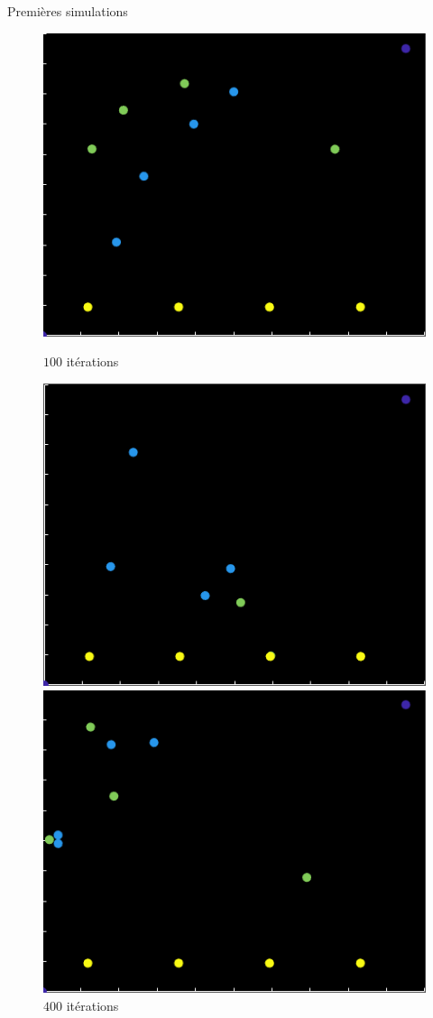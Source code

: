 \documentclass[final,hyperref={pdfpagelabels=false}]{beamer}
\begin{document}
\begin{frame}[t]
\begin{columns}[t]
\begin{column}{.465\textwidth}
\begin{block}{Premi\`eres simulations}
\begin{figure}[h!]
\begin{minipage}[b]{0.50\linewidth}
      \centering \includegraphics[scale=1.4]{simu_100.png}
      \caption{\text{ } $100$ it\'erations}      
   \end{minipage}\hfill
   \begin{minipage}[b]{0.50\linewidth}   
      \centering \includegraphics[scale=1.4]{simu_400.png}
      \caption{\text{ } $400$ it\'erations}      
   \end{minipage}
   \begin{minipage}[b]{0.50\linewidth}
      \centering \includegraphics[scale=1.4]{simu_200.png}

\end{minipage}
\end{figure}
\end{block}
\end{column}
\end{columns}
\end{frame}
\end{document}
